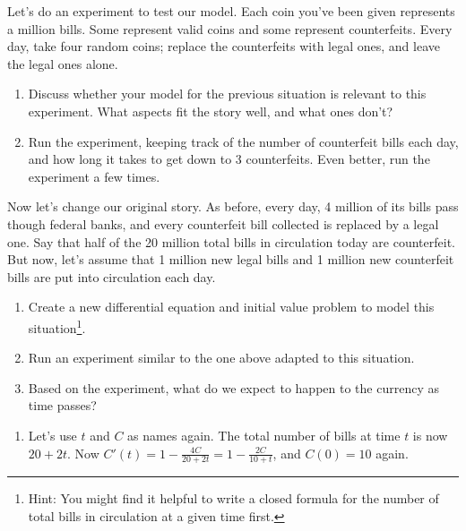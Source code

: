 \documentclass[12pt]{amsart}
\numberwithin{equation}{section}
\theoremstyle{plain} %
\theoremstyle{definition}
\theoremstyle{remark}
\begin{document}
Let's do an experiment to test our model. Each coin you've been given represents a million bills. Some represent valid coins and some represent counterfeits. Every day, take four random coins; replace the counterfeits with legal ones, and leave the legal ones alone.

\begin{enumerate}
\item Discuss whether your model for the previous situation is relevant to this experiment. What aspects fit the story well, and what ones don't?
\item Run the experiment, keeping track of the number of counterfeit bills each day, and how long it takes to get down to 3 counterfeits. Even better, run the experiment a few times.
\end{enumerate}

Now let's change our original story. As before, every day, 4 million of its bills pass though federal banks, and every counterfeit bill collected is replaced by a legal one. Say that half of the 20 million total bills in circulation today are counterfeit. But now, let's assume that 1 million new legal bills and 1 million new counterfeit bills are put into circulation each day.

\begin{enumerate}
\item Create a new differential equation and initial value problem to model this situation\footnote{Hint: You might find it helpful to write a closed formula for the number of total bills in circulation at a given time first.}. 
\item Run an experiment similar to the one above adapted to this situation.
\item Based on the experiment, what do we expect to happen to the currency as time passes?
\end{enumerate}
\begin{framed}
\begin{enumerate}
\item Let's use $t$ and $C$ as names again. The total number of bills at time $t$ is now $20+2t$. Now $C'(t) = 1 - \frac{4 C}{20+2t} = 1-\frac{2C}{10+t}$, and $C(0)=10$ again.
\end{enumerate}
\end{framed}
\end{document}
